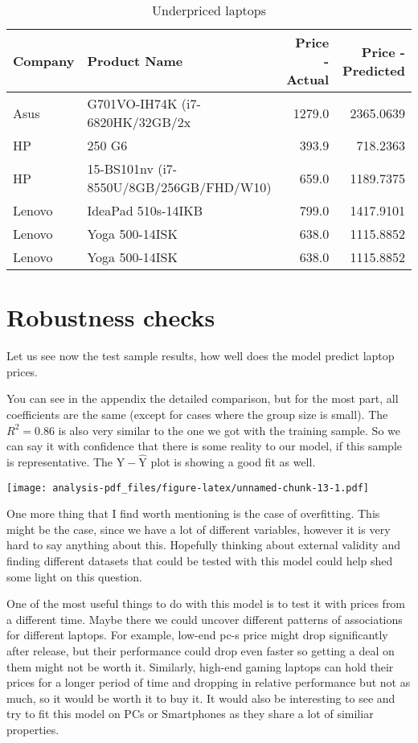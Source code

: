 \documentclass[
]{article}
\begin{document}
\begin{table}

\caption{\label{tab:unnamed-chunk-11}Underpriced laptops}
\centering
\begin{tabular}[t]{l|l|r|r}
\hline
Company & Product Name & Price - Actual & Price - Predicted\\
\hline
Asus & G701VO-IH74K (i7-6820HK/32GB/2x & 1279.0 & 2365.0639\\
\hline
HP & 250 G6 & 393.9 & 718.2363\\
\hline
HP & 15-BS101nv (i7-8550U/8GB/256GB/FHD/W10) & 659.0 & 1189.7375\\
\hline
Lenovo & IdeaPad 510s-14IKB & 799.0 & 1417.9101\\
\hline
Lenovo & Yoga 500-14ISK & 638.0 & 1115.8852\\
\hline
Lenovo & Yoga 500-14ISK & 638.0 & 1115.8852\\
\hline
\end{tabular}
\end{table}

\hypertarget{robustness-checks}{%
\section{Robustness checks}\label{robustness-checks}}

Let us see now the test sample results, how well does the model predict
laptop prices.

You can see in the appendix the detailed comparison, but for the most
part, all coefficients are the same (except for cases where the group
size is small). The \(R^2=0.86\) is also very similar to the one we got
with the training sample. So we can say it with confidence that there is
some reality to our model, if this sample is representative. The
\(\text{Y} - \hat{\text{Y}}\) plot is showing a good fit as well.

\texttt{[image: analysis-pdf\_files/figure-latex/unnamed-chunk-13-1.pdf]}

One more thing that I find worth mentioning is the case of overfitting.
This might be the case, since we have a lot of different variables,
however it is very hard to say anything about this. Hopefully thinking
about external validity and finding different datasets that could be
tested with this model could help shed some light on this question.

One of the most useful things to do with this model is to test it with
prices from a different time. Maybe there we could uncover different
patterns of associations for different laptops. For example, low-end
pc-s price might drop significantly after release, but their performance
could drop even faster so getting a deal on them might not be worth it.
Similarly, high-end gaming laptops can hold their prices for a longer
period of time and dropping in relative performance but not as much, so
it would be worth it to buy it. It would also be interesting to see and
try to fit this model on PCs or Smartphones as they share a lot of
similiar properties.
\end{document}
